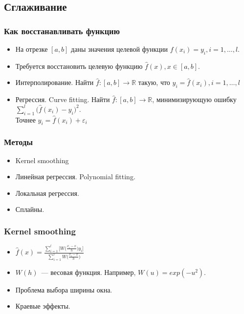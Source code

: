 \documentclass[smaller]{beamer}
\begin{document}
\subsection{Сглаживание}
\begin{frame}
  \frametitle{Как восстанавливать функцию}
    \begin{itemize}
   \item На отрезке $[a,b]$ даны значения целевой функции $f(x_i)=y_i, i=1,\dots,l$.
   \item Требуется восстановить целевую функцию $\hat{f}(x), x\in[a,b]$.
   \item Интерполирование. Найти $\hat{f}:[a,b]\rightarrow\mathbb{R}$ такую, что $y_i=\hat{f}(x_i), i=1,\dots,l$
   \item Регрессия. Curve fitting. Найти $\hat{f}:[a,b]\rightarrow\mathbb{R}$, минимизирующую ошибку $\sum_{i=1}^l \bigl(\hat{f}(x_i)-y_i\bigr)^2$.\\
	  Точнее $y_i=\hat{f}(x_i)+\varepsilon_i$
   \end{itemize}
\end{frame}

\begin{frame}
  \frametitle{Методы}
    \begin{itemize}
   \item Kernel smoothing
   \item Линейная регрессия. Polynomial fitting.
   \item Локальная регрессия.
   \item Сплайны.
   \end{itemize}
\end{frame}

\begin{frame}
  \frametitle{Kernel smoothing}
   \begin{itemize}
    \item $\hat{f}(x) = \frac{  \sum_{i=1}^l\biggl[ W\bigl( \frac{x_i-x}h \bigr)y_i \biggr] }{ \sum_{i=1}^lW\bigl( \frac{x_i-x}h \bigr) }$
    \item $W(h)$~--- весовая функция. Например, $W(u)=exp(-u^2)$.
    \item Проблема выбора ширины окна.
    \item Краевые эффекты.
   \end{itemize} 
\end{frame}
\end{document}

